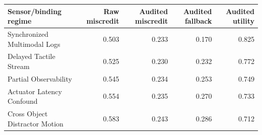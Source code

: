 \begin{tabular}{lrrrr}
\toprule
Sensor/binding regime & Raw miscredit & Audited miscredit & Audited fallback & Audited utility \\
\midrule
Synchronized Multimodal Logs & 0.503 & 0.233 & 0.170 & 0.825 \\
Delayed Tactile Stream & 0.525 & 0.230 & 0.232 & 0.772 \\
Partial Observability & 0.545 & 0.234 & 0.253 & 0.749 \\
Actuator Latency Confound & 0.554 & 0.235 & 0.270 & 0.733 \\
Cross Object Distractor Motion & 0.583 & 0.243 & 0.286 & 0.712 \\
\bottomrule
\end{tabular}
